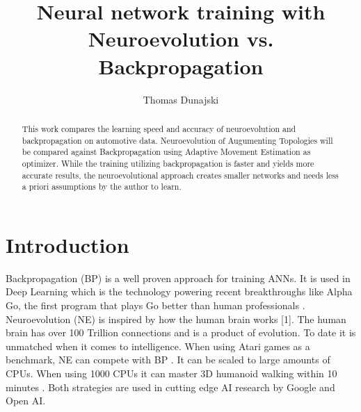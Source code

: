 \documentclass{llncs}
\begin{document}
%
\frontmatter %
%
\pagestyle{headings}  %
%
\mainmatter %
%
\title{Neural network training with Neuroevolution vs. Backpropagation}
%
%
\author{Thomas Dunajski}
%


\maketitle %

\begin{abstract}
This work compares the learning speed and accuracy of neuroevolution and backpropagation on automotive data. Neuroevolution of Augumenting Topologies will be compared against Backpropagation using Adaptive Movement Estimation as optimizer. While the training utilizing backpropagation is faster and yields more accurate results, the neuroevolutional approach creates smaller networks and needs less a priori assumptions by the author to learn.
\end{abstract}

\section{Introduction}
%
Backpropagation (BP) is a well proven approach for training ANNs. It is used in Deep Learning which is the technology powering recent breakthroughs like Alpha Go, the first program that plays Go better than human professionals \cite{Silver.2016}. Neuroevolution (NE) is inspired by how the human brain works [1]. The human brain has over 100 Trillion connections and is a product of evolution. To date it is unmatched when it comes to intelligence. When using Atari games as a benchmark, NE can compete with BP \cite{Salimans.11.03.2017}. It can be scaled to large amounts of CPUs. When using 1000 CPUs it can master 3D humanoid walking within 10 minutes \cite{Salimans.11.03.2017}. Both strategies are used in cutting edge AI research by Google and Open AI. 
%
\end{document}
